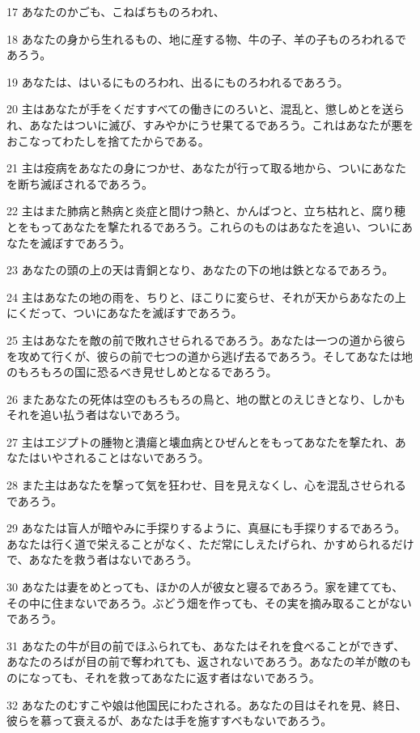 \par 17 あなたのかごも、こねばちものろわれ、
\par 18 あなたの身から生れるもの、地に産する物、牛の子、羊の子ものろわれるであろう。
\par 19 あなたは、はいるにものろわれ、出るにものろわれるであろう。
\par 20 主はあなたが手をくだすすべての働きにのろいと、混乱と、懲しめとを送られ、あなたはついに滅び、すみやかにうせ果てるであろう。これはあなたが悪をおこなってわたしを捨てたからである。
\par 21 主は疫病をあなたの身につかせ、あなたが行って取る地から、ついにあなたを断ち滅ぼされるであろう。
\par 22 主はまた肺病と熱病と炎症と間けつ熱と、かんばつと、立ち枯れと、腐り穂とをもってあなたを撃たれるであろう。これらのものはあなたを追い、ついにあなたを滅ぼすであろう。
\par 23 あなたの頭の上の天は青銅となり、あなたの下の地は鉄となるであろう。
\par 24 主はあなたの地の雨を、ちりと、ほこりに変らせ、それが天からあなたの上にくだって、ついにあなたを滅ぼすであろう。
\par 25 主はあなたを敵の前で敗れさせられるであろう。あなたは一つの道から彼らを攻めて行くが、彼らの前で七つの道から逃げ去るであろう。そしてあなたは地のもろもろの国に恐るべき見せしめとなるであろう。
\par 26 またあなたの死体は空のもろもろの鳥と、地の獣とのえじきとなり、しかもそれを追い払う者はないであろう。
\par 27 主はエジプトの腫物と潰瘍と壊血病とひぜんとをもってあなたを撃たれ、あなたはいやされることはないであろう。
\par 28 また主はあなたを撃って気を狂わせ、目を見えなくし、心を混乱させられるであろう。
\par 29 あなたは盲人が暗やみに手探りするように、真昼にも手探りするであろう。あなたは行く道で栄えることがなく、ただ常にしえたげられ、かすめられるだけで、あなたを救う者はないであろう。
\par 30 あなたは妻をめとっても、ほかの人が彼女と寝るであろう。家を建てても、その中に住まないであろう。ぶどう畑を作っても、その実を摘み取ることがないであろう。
\par 31 あなたの牛が目の前でほふられても、あなたはそれを食べることができず、あなたのろばが目の前で奪われても、返されないであろう。あなたの羊が敵のものになっても、それを救ってあなたに返す者はないであろう。
\par 32 あなたのむすこや娘は他国民にわたされる。あなたの目はそれを見、終日、彼らを慕って衰えるが、あなたは手を施すすべもないであろう。
